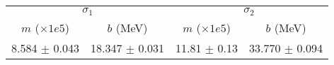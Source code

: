 \begin{tabular}{cc|cc}
\multicolumn{2}{c|}{$\sigma_1$} & \multicolumn{2}{|c}{$\sigma_2$} \\
$m$ ($\times1e5$) & $b$ (MeV) & $m$ ($\times1e5$) & $b$ (MeV) \\
\hline
8.584 $\pm$ 0.043 & 18.347 $\pm$ 0.031 & 11.81 $\pm$ 0.13 & 33.770 $\pm$ 0.094\\
\end{tabular}
